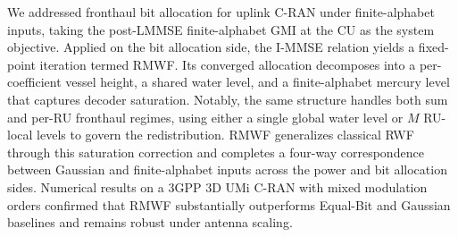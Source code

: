 \documentclass[10pt, twocolumn, comsoc]{IEEEtran}
\begin{document}
We addressed fronthaul bit allocation for uplink C-RAN under finite-alphabet inputs, taking the post-LMMSE finite-alphabet GMI at the CU as the system objective.
Applied on the bit allocation side, the I-MMSE relation yields a fixed-point iteration termed RMWF.
Its converged allocation decomposes into a per-coefficient vessel height, a shared water level, and a finite-alphabet mercury level that captures decoder saturation.
Notably, the same structure handles both sum and per-RU fronthaul regimes, using either a single global water level or $M$ RU-local levels to govern the redistribution.
RMWF generalizes classical RWF through this saturation correction and completes a four-way correspondence between Gaussian and finite-alphabet inputs across the power and bit allocation sides.
Numerical results on a 3GPP 3D UMi C-RAN with mixed modulation orders confirmed that RMWF substantially outperforms Equal-Bit and Gaussian baselines and remains robust under antenna scaling. 




\end{document}
